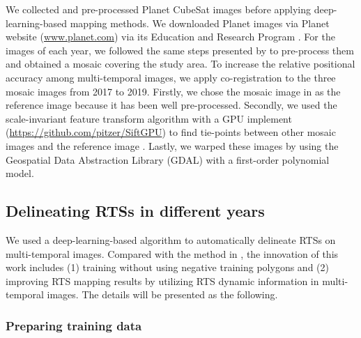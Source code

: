\documentclass[authoryear,preprint,review,12pt]{elsarticle}
\begin{document}
We collected and pre-processed Planet CubeSat images before applying deep-learning-based mapping methods. 
We downloaded Planet images via Planet website (\url{www.planet.com}) via its Education and Research Program \citep{team2017planet}. 
For the images of each year, we followed the same steps presented by \cite{huang2020using} to pre-process them and obtained a mosaic covering the study area. 
To increase the relative positional accuracy among multi-temporal images, we apply co-registration to the three mosaic images from 2017 to 2019. 
Firstly, we chose the mosaic image in \cite{huang2020using} as the reference image because it has been well pre-processed. Secondly, we used the scale-invariant feature transform algorithm \citep{lowe2004distinctive} with a GPU implement (\url{https://github.com/pitzer/SiftGPU}) to find tie-points between other mosaic images and the reference image \citep{huang2016a}. 
Lastly, we warped these images by using the Geospatial Data Abstraction Library (GDAL) with a first-order polynomial model.



\subsection{Delineating RTSs in different years}
\label{sec_delineating}

We used a deep-learning-based algorithm \citep{huang2020using} to automatically delineate RTSs on multi-temporal images.
Compared with the method in \cite{huang2020using},  the innovation of this work includes (1) training without using negative training polygons and (2) improving RTS mapping results by utilizing RTS dynamic information in multi-temporal images. 
The details will be presented as the following.


\subsubsection{Preparing training data} 
\label{sec_prepare_training}
\end{document}
